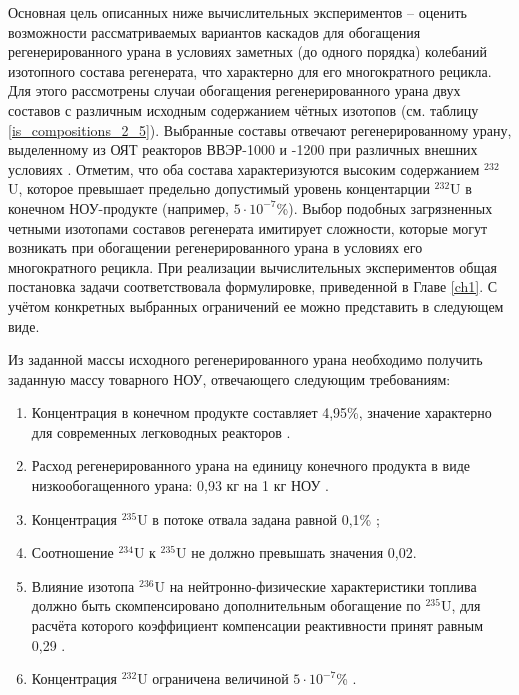 Основная цель описанных ниже вычислительных экспериментов -- оценить возможности рассматриваемых вариантов каскадов для обогащения регенерированного урана в условиях заметных (до одного порядка) колебаний изотопного состава регенерата, что характерно для его многократного рецикла. Для этого рассмотрены случаи обогащения регенерированного урана двух составов с различным исходным содержанием чётных изотопов (см. таблицу \ref{is_compositions_2_5}). Выбранные составы отвечают регенерированному урану, выделенному из ОЯТ реакторов ВВЭР-1000 и -1200 при различных внешних условиях \cite{palkinDesignanalyticalResearchRefinement2010,nevinicaToplivnyyCiklLegkovodnogo2019}. Отметим, что оба состава характеризуются высоким содержанием $^{232}$U, которое превышает предельно допустимый уровень концентарции $^{232}$U в конечном НОУ-продукте (например, $5\cdot10^{-7}$\%). Выбор подобных загрязненных четными изотопами составов регенерата имитирует сложности, которые могут возникать при обогащении регенерированного урана в условиях его многократного рецикла.  
При реализации вычислительных экспериментов общая постановка задачи соответствовала формулировке, приведенной в Главе \ref{ch1}. С учётом конкретных выбранных ограничений ее можно представить в следующем виде.

Из заданной массы исходного регенерированного урана необходимо получить заданную массу товарного НОУ, отвечающего следующим требованиям:

\begin{enumerate}
  \item Концентрация в конечном продукте составляет 4,95\%, значение характерно для современных легководных реакторов \cite{solovevaCennostiOYaTKak2019}.
  \item Расход регенерированного урана на единицу конечного продукта в виде низкообогащенного урана: 0,93 кг на 1 кг НОУ \cite{smirnovApplyingEnrichmentCapacities2018}.
  \item Концентрация $^{235}$U в потоке отвала задана равной 0,1\% \cite{smirnovEvolutionIsotopicComposition2012};
  \item Соотношение $^{234}$U к $^{235}$U не должно превышать значения 0,02.
  \item Влияние изотопа $^{236}$U на нейтронно-физические характеристики топлива должно быть скомпенсировано дополнительным обогащение по $^{235}$U, для расчёта которого коэффициент компенсации реактивности принят равным 0,29 \cite{smirnovApplyingEnrichmentCapacities2018}.
  \item Концентрация $^{232}$U ограничена величиной $5\cdot10^{-7}$\% \cite{smirnovApplyingEnrichmentCapacities2018}.
\end{enumerate}

